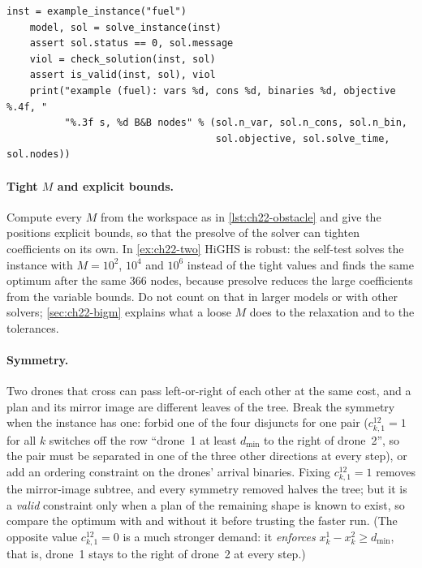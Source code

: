 \begin{lstlisting}[caption={Solving and checking the two-drone instance of \cref{ex:ch22-two} (from the self-test of \code{code/ch22\_milp.py}).},label={lst:ch22-use}]
    inst = example_instance("fuel")
    model, sol = solve_instance(inst)
    assert sol.status == 0, sol.message
    viol = check_solution(inst, sol)
    assert is_valid(inst, sol), viol
    print("example (fuel): vars %d, cons %d, binaries %d, objective %.4f, "
          "%.3f s, %d B&B nodes" % (sol.n_var, sol.n_cons, sol.n_bin,
                                    sol.objective, sol.solve_time, sol.nodes))
\end{lstlisting}

\paragraph{Tight $M$ and explicit bounds.}
Compute every $M$ from the workspace as in \cref{lst:ch22-obstacle} and
give the positions explicit bounds, so that the presolve of the solver can
tighten coefficients on its own. In \cref{ex:ch22-two} HiGHS is robust:
the self-test solves the instance with $M = 10^2$, $10^4$ and $10^6$
instead of the tight values and finds the same optimum after the same
$366$ nodes, because presolve reduces the large coefficients from the
variable bounds. Do not count on that in larger models or with other
solvers; \cref{sec:ch22-bigm} explains what a loose $M$ does to the
relaxation and to the tolerances.

\paragraph{Symmetry.}
Two drones that cross can pass left-or-right of each other at the same
cost, and a plan and its mirror image are different leaves of the tree.
Break the symmetry when the instance has one: forbid one of the four
disjuncts for one pair ($c^{12}_{k,1} = 1$ for all $k$ switches off the row
``drone~1 at least $d_{\min}$ to the right of drone~2'', so the pair must be
separated in one of the three other directions at every step), or add an
ordering constraint on the drones' arrival binaries. Fixing
$c^{12}_{k,1} = 1$ removes the mirror-image subtree, and every symmetry
removed halves the tree; but it is a \emph{valid} constraint only when a
plan of the remaining shape is known to exist, so compare the optimum with
and without it before trusting the faster run. (The opposite value
$c^{12}_{k,1} = 0$ is a much stronger demand: it \emph{enforces}
$x^1_k - x^2_k \ge d_{\min}$, that is, drone~1 stays to the right of drone~2
at every step.)


